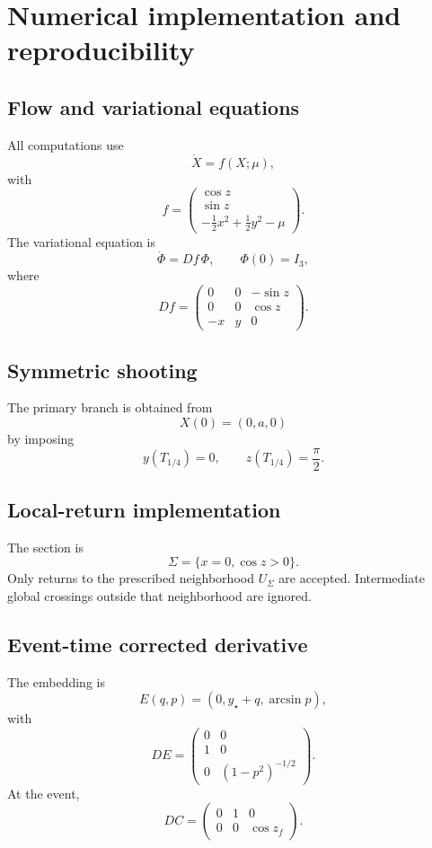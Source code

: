 \section{Numerical implementation and reproducibility}
\label{app:numerics}

\subsection{Flow and variational equations}

All computations use
\[
\dot X=f(X;\mu),
\]
with
\[
f=
\begin{pmatrix}
\cos z\\
\sin z\\
-\frac12x^2+\frac12y^2-\mu
\end{pmatrix}.
\]
The variational equation is
\[
\boxed{
\dot\Phi=Df\,\Phi,\qquad
\Phi(0)=I_3,
}
\]
where
\[
\boxed{
Df=
\begin{pmatrix}
0&0&-\sin z\\
0&0&\cos z\\
-x&y&0
\end{pmatrix}.
}
\]

\subsection{Symmetric shooting}

The primary branch is obtained from
\[
X(0)=(0,a,0)
\]
by imposing
\[
\boxed{
y(T_{1/4})=0,\qquad
z(T_{1/4})=\frac{\pi}{2}.
}
\]

\subsection{Local-return implementation}

The section is
\[
\Sigma=\{x=0,\cos z>0\}.
\]
Only returns to the prescribed neighborhood \(U_\Sigma\) are accepted. Intermediate global crossings outside that neighborhood are ignored.

\subsection{Event-time corrected derivative}

The embedding is
\[
E(q,p)=(0,y_\star+q,\arcsin p),
\]
with
\[
DE=
\begin{pmatrix}
0&0\\
1&0\\
0&(1-p^2)^{-1/2}
\end{pmatrix}.
\]
At the event,
\[
DC=
\begin{pmatrix}
0&1&0\\
0&0&\cos z_f
\end{pmatrix}.
\]

